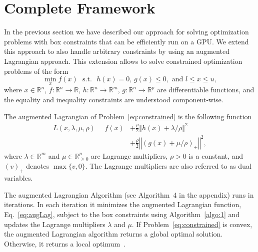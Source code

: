 \documentclass[letterpaper]{article} %
\DeclareMathOperator{\st}{s.t.}
\newcommand{\setR}{\mathbb{R}}
\newcommand{\norm}[1]{\left\Vert#1\right\Vert}
\begin{document}
\section{Complete Framework} \label{sec:framework}
In the previous section we have described our approach for solving optimization problems with box constraints that can be efficiently run on a GPU. We extend this approach to also handle arbitrary constraints by using an augmented Lagrangian approach. This extension allows to solve constrained optimization problems of the form
\begin{equation} \label{eq:constrained}
\min_{x}  f(x) \:\,\st\:\, h(x) = 0,\, g(x) \leq 0, \textrm{ and } l \leq x \leq u,
\end{equation}
where $x\in\setR^n$, $f\colon \setR^n \to \setR$, $h\colon\setR^n\to\setR^m$, $g\colon\setR^n\to\setR^p$ are differentiable functions, and the equality and inequality constraints are understood component-wise.

The augmented Lagrangian of Problem~\eqref{eq:constrained} is the
following function
\begin{equation}
\label{eq:augLag}
\begin{aligned}
  L (x, \lambda, \mu, \rho) = f(x) & + \frac{\rho}{2}
  \norm{h(x)+\lambda /\rho}^2 \\
  & + \frac{\rho}{2} \norm{\left(g(x)
    + \mu /\rho\right)_+}^2,
\end{aligned}
\end{equation}
where $\lambda\in\setR^m$ and $\mu\in\setR_{\geq 0}^p$ are Lagrange
multipliers, \mbox{$\rho >0$} is a constant, and $(v)_+$ denotes $\max\{v, 0\}$. The Lagrange multipliers are also referred to as dual variables.

The augmented Lagrangian Algorithm (see Algorithm~4 in the appendix) runs in iterations. In each iteration it minimizes the augmented Lagrangian function, Eq.~\eqref{eq:augLag}, subject to the box constraints using Algorithm~\ref{algo:1} and updates the Lagrange multipliers $\lambda$ and $\mu$. If Problem~\eqref{eq:constrained} is convex, the augmented Lagrangian algorithm returns a global optimal solution. Otherwise, it returns a local optimum~\cite{Bertsekas99}. 
\end{document}
